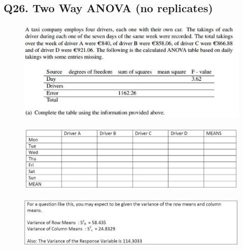 \documentclass[a4paper,12pt]{article}
\begin{document}
\subsection*{Q26. Two Way ANOVA (no replicates)}
\begin{figure}[h!]
	\centering
	\includegraphics[width=0.8\linewidth]{image/Q26Review1}
	
\end{figure}
\begin{figure}[h!]
	\centering
	\includegraphics[width=0.8\linewidth]{image/Q26review2}
	
\end{figure}
\begin{figure}[h!]
	\centering
	\includegraphics[width=0.8\linewidth]{image/Q26review3}
	
\end{figure}
\newpage
\end{document}
